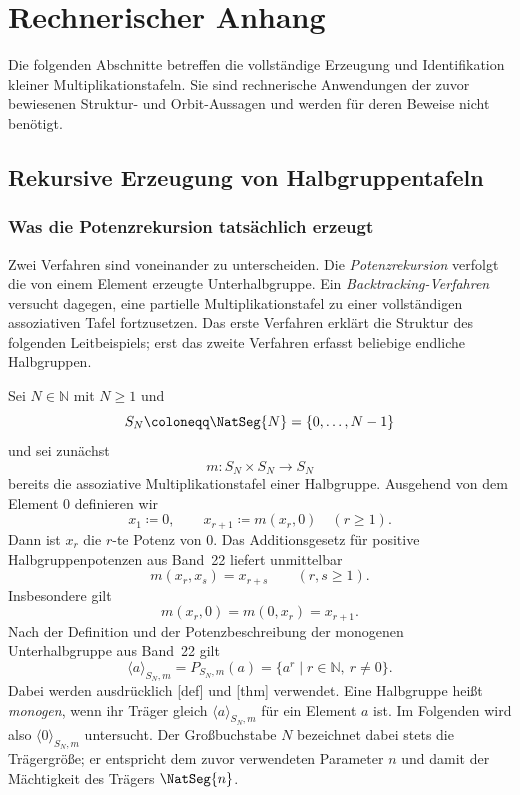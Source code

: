 \documentclass[main.tex]{subfiles}
\begin{document}
\chapter{Rechnerischer Anhang}

Die folgenden Abschnitte betreffen die vollständige Erzeugung und
Identifikation kleiner Multiplikationstafeln.  Sie sind rechnerische
Anwendungen der zuvor bewiesenen Struktur- und Orbit-Aussagen und werden
für deren Beweise nicht benötigt.

\section{Rekursive Erzeugung von Halbgruppentafeln}

\subsection{Was die Potenzrekursion tatsächlich erzeugt}

Zwei Verfahren sind voneinander zu unterscheiden.  Die
\emph{Potenzrekursion} verfolgt die von einem Element erzeugte
Unterhalbgruppe.  Ein \emph{Backtracking-Verfahren} versucht dagegen, eine
partielle Multiplikationstafel zu einer vollständigen assoziativen Tafel
fortzusetzen.  Das erste Verfahren erklärt die Struktur des folgenden
Leitbeispiels; erst das zweite Verfahren erfasst beliebige endliche
Halbgruppen.

Sei \(N\in\mathbb N\) mit \(N\geq1\) und
\[
  S_N\coloneqq\NatSeg{N}=\{0,\ldots,N-1\}
\]
und sei zunächst
\[
  m\colon S_N\times S_N\to S_N
\]
bereits die assoziative Multiplikationstafel einer Halbgruppe.  Ausgehend von
dem Element \(0\) definieren wir
\[
  x_1\coloneqq0,
  \qquad
  x_{r+1}\coloneqq m(x_r,0)
  \quad(r\geq1).
\]
Dann ist \(x_r\) die \(r\)-te Potenz von \(0\).  Das Additionsgesetz für
positive Halbgruppenpotenzen aus Band~22 liefert unmittelbar
\[
  \boxed{m(x_r,x_s)=x_{r+s}}
  \qquad(r,s\geq1).
\]
Insbesondere gilt
\[
  m(x_r,0)=m(0,x_r)=x_{r+1}.
\]
Nach der Definition und der Potenzbeschreibung der monogenen
Unterhalbgruppe aus Band~22 gilt
\[
  \langle a\rangle_{S_N,m}
  =P_{S_N,m}(a)
  =\{a^r\mid r\in\mathbb N,\ r\neq0\}.
\]
Dabei werden ausdrücklich
[def] und
[thm] verwendet.  Eine
Halbgruppe heißt \emph{monogen}, wenn ihr Träger gleich
\(\langle a\rangle_{S_N,m}\) für ein Element \(a\) ist.  Im Folgenden wird
also \(\langle0\rangle_{S_N,m}\) untersucht.  Der Großbuchstabe \(N\) bezeichnet dabei
stets die Trägergröße; er entspricht dem zuvor verwendeten Parameter \(n\)
und damit der Mächtigkeit des Trägers \(\NatSeg{n}\).
\end{document}
